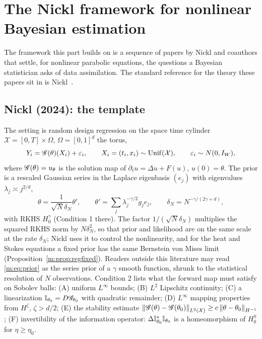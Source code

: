 \section[\texorpdfstring{The Nickl framework for nonlinear Bayesian\newline estimation}{The Nickl framework for nonlinear Bayesian estimation}]{The Nickl framework for nonlinear Bayesian estimation}\label{m:sec:papers}

The framework this part builds on is a sequence of papers by Nickl and coauthors that settle, for nonlinear parabolic equations, the questions a Bayesian statistician asks of data assimilation. The standard reference for the theory these papers sit in is Nickl~\cite{nickl2023book}.

\subsection{Nickl (2024): the template}

The setting is random design regression on the space time cylinder $\mathcal X=[0,T]\times\Omega$, $\Omega=[0,1]^d$ the torus,
\begin{equation}\label{m:eq:model}
Y_i=\mathscr{G}(\theta)(X_i)+\varepsilon_i,\qquad X_i=(t_i,x_i)\sim\mathrm{Unif}(\mathcal X),\qquad\varepsilon_i\sim N(0,I_W),
\end{equation}
where $\mathscr{G}(\theta)=u_\theta$ is the solution map of $\partial_tu=\Delta u+F(u)$, $u(0)=\theta$. The prior is a rescaled Gaussian series in the Laplace eigenbasis $(e_j)$ with eigenvalues $\lambda_j\asymp j^{2/d}$,
\begin{equation}\label{m:eq:prior}
\theta=\frac{1}{\sqrt N\delta_N}\theta',\qquad\theta'=\sum_j\lambda_j^{-\gamma/2}g_je_j,\qquad\delta_N=N^{-\gamma/(2\gamma+d)},
\end{equation}
with RKHS $H_0^\gamma$ (Condition 1 there). The factor $1/(\sqrt N\delta_N)$ multiplies the squared RKHS norm by $N\delta_N^2$, so that prior and likelihood are on the same scale at the rate $\delta_N$; Nickl uses it to control the nonlinearity, and for the heat and Stokes equations a fixed prior has the same Bernstein von Mises limit (Proposition~\ref{m:prop:regfixed}). Readers outside this literature may read \eqref{m:eq:prior} as the series prior of a $\gamma$ smooth function, shrunk to the statistical resolution of $N$ observations. Condition 2 lists what the forward map must satisfy on Sobolev balls: (A) uniform $L^\infty$ bounds; (B) $L^2$ Lipschitz continuity; (C) a linearization $\mathbb{I}_{\theta_0}=D\mathscr{G}_{\theta_0}$ with quadratic remainder; (D) $L^\infty$ mapping properties from $H^\zeta$, $\zeta>d/2$; (E) the stability estimate $\left\|\mathscr{G}(\theta)-\mathscr{G}(\theta_0)\right\|_{L^2(\mathcal X)}\ge c\left\|\theta-\theta_0\right\|_{H^{-1}}$; (F) invertibility of the information operator: $\Delta\mathbb{I}^*_{\theta_0}\mathbb{I}_{\theta_0}$ is a homeomorphism of $H^\eta_0$ for $\eta\ge\eta_0$.

